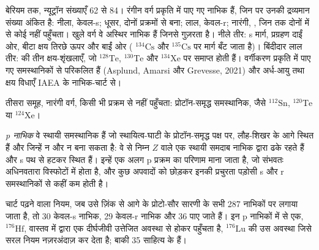 \begin{omfigure}
{बेरियम तक, न्यूट्रॉन संख्याएँ 62 से 84। रंगीन वर्ग प्रकृति में पाए गए नाभिक हैं, जिन पर
उनकी द्रव्यमान संख्या अंकित है: नीला, केवल-s; धूसर, दोनों प्रक्रमों से बना; लाल,
केवल-r; नारंगी, , जिन तक दोनों में से कोई नहीं पहुँचता। खुले वर्ग वे
अस्थिर नाभिक हैं जिनसे  गुज़रता है। नीले तीर: s मार्ग,
प्रग्रहण दाईं ओर, बीटा क्षय तिरछे ऊपर और बाईं ओर (
$^{134}\mathrm{Cs}$ और $^{135}\mathrm{Cs}$ पर मार्ग बँट जाता है)। बिंदीदार लाल
तीर:  की तीन क्षय-शृंखलाएँ, जो
$^{128}\mathrm{Te}$, $^{130}\mathrm{Te}$ और $^{134}\mathrm{Xe}$ पर समाप्त होती हैं। वर्गीकरण
प्रकृति में पाए गए समस्थानिकों से परिकलित हैं (Asplund,
Amarsi और Grevesse, 2021) और अर्ध-आयु तथा क्षय विधाएँ
IAEA के नाभिक-चार्ट से।}\label{fig:b3:origin-of-elements:chart}
\end{omfigure}

तीसरा समूह, नारंगी वर्ग, किसी भी प्रक्रम से नहीं पहुँचता:
प्रोटॉन-समृद्ध समस्थानिक, जैसे $^{112}\mathrm{Sn}$, $^{120}\mathrm{Te}$
या $^{124}\mathrm{Xe}$।

\begin{definition}[p नाभिक]\label{def:b3:origin-of-elements:p-process}
\emph{p नाभिक} वे स्थायी समस्थानिक हैं जो स्थायित्व-घाटी के प्रोटॉन-समृद्ध पक्ष पर,
लौह-शिखर के आगे स्थित हैं और जिन्हें न  और न  बना सकता है:
वे  से निम्न $Z$ वाले एक स्थायी समदाब नाभिक द्वारा ढके रहते हैं
और s पथ से हटकर स्थित हैं। इन्हें एक अलग p प्रक्रम का परिणाम माना जाता है,
जो संभवतः अधिनवतारा विस्फोटों में होता है, और
कुछ अपवादों को छोड़कर इनकी प्रचुरता पड़ोसी s और r समस्थानिकों से
कहीं कम होती है।
\end{definition}

चार्ट पढ़ने वाला नियम, जब उसे ज़िंक से आगे के प्रोटो-सौर सारणी के सभी 287 नाभिकों पर लगाया जाता है,
तो 30 केवल-s नाभिक, 29 केवल-r नाभिक
और 36  पाए जाते हैं। इन p नाभिकों में से एक, $^{176}\mathrm{Hf}$, वास्तव में
 द्वारा एक दीर्घजीवी उत्तेजित अवस्था से होकर पहुँचता है,
$^{176}\mathrm{Lu}$ की उस अवस्था जिसे सरल नियम नज़रअंदाज़ कर देता है;
बाकी 35 साहित्य के  हैं।

